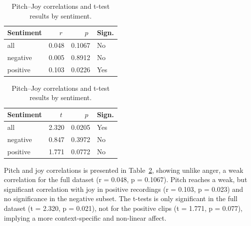   \begin{table}[H]
    \centering
  
    \begin{subtable}{0.45\textwidth}
      \centering
      \caption{Pitch and Joy (r)}\label{tab:rq1_corr_pitch_joy}
      \begin{tabular}{l r r l}
        \toprule
        Sentiment & \(\;r\;\) & \(\;p\;\) & Sign. \\
        \midrule
        all      & 0.048 & 0.1067 & No  \\
        negative & 0.005 & 0.8912 & No  \\
        positive & 0.103 & 0.0226 & Yes \\
        \bottomrule
      \end{tabular}
    \end{subtable}\hfill
    \begin{subtable}{0.45\textwidth}
      \centering
      \caption{Pitch and Joy (t-test)}\label{tab:rq1_ttest_pitch_joy}
      \begin{tabular}{l r r l}
        \toprule
        Sentiment & \(\;t\;\) & \(\;p\;\) & Sign. \\
        \midrule
        all      & 2.320 & 0.0205 & Yes \\
        negative & 0.847 & 0.3972 & No  \\
        positive & 1.771 & 0.0772 & No  \\
        \bottomrule
      \end{tabular}
    \end{subtable}
  
    \caption{Pitch–Joy correlations and t-test results by sentiment.}
    \label{tab:rq1_pitch_joy_side_by_side}
  \end{table}
  
  Pitch and joy correlations is presented in Table~\ref{tab:rq1_pitch_joy_side_by_side}, showing unlike anger, a weak correlation for the full dataset (r = 0.048, p = 0.1067). 
  Pitch reaches a weak, but significant correlation with joy in positive recordings (r = 0.103, p = 0.023) and no significance in the negative subset. 
  The t-tests is only significant in the full dataset (t = 2.320, p = 0.021), not for the positive clips (t = 1.771, p = 0.077), implying a more context-specific and non-linear affect.
  
